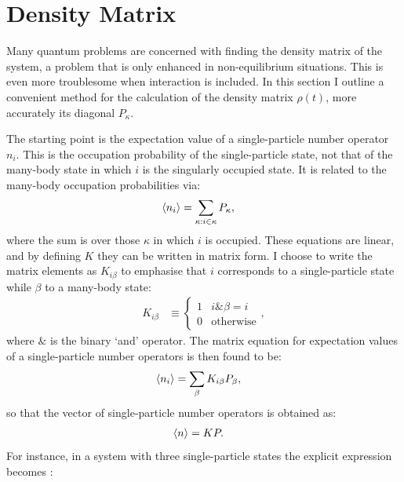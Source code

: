 \section{Density Matrix}
\label{sec:densitymatrix}
Many quantum problems are concerned with finding the density matrix of the system, a problem that is only enhanced in non-equilibrium situations. This is even more troublesome when interaction is included. In this section I outline a convenient method for the calculation of the density matrix $\rho(t)$, more accurately its diagonal $P_\kappa$.

The starting point is the expectation value of a single-particle number operator $n_i$. This is the occupation probability of the single-particle state, not that of the many-body state in which $i$ is the singularly occupied state. It is related to the many-body occupation probabilities via:
\begin{align*}
\braket{n_i} &= \sum_{\kappa: i \in \kappa} P_\kappa,
\end{align*} where the sum is over those $\kappa$ in which $i$ is occupied. These equations are linear, and by defining $K$ they can be written in matrix form. I choose to write the matrix elements as $K_{i\beta}$ to emphasise that $i$ corresponds to a single-particle state while $\beta$ to a many-body state:
\begin{align*}
K_{i\beta} &\equiv \begin{cases} 1 & i \& \beta = i\\ 0 & \text{otherwise} \end{cases},
\end{align*} where $\&$ is the binary `and' operator. The matrix equation for expectation values of a single-particle number operators is then found to be:
\begin{align*}
\braket{n_i} &= \sum_{\beta} K_{i\beta} P_\beta, 
\end{align*}
so that the vector of single-particle number operators is obtained as:
\begin{align}
\braket{n} &= K P \label{eq:nkp}.
\end{align}
For instance, in a system with three single-particle states the explicit expression becomes \cite{seldenthuis}:
